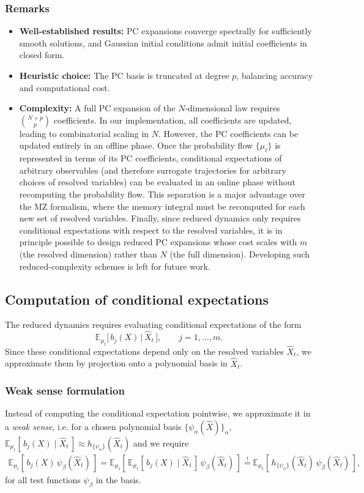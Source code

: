 \documentclass[11pt, a4paper, oneside, reqno]{amsart}
\begin{document}
\subsubsection{Remarks}
\begin{itemize}
\item \textbf{Well-established results:} PC expansions converge spectrally for sufficiently smooth solutions, and Gaussian initial conditions admit initial coefficients in closed form.  
\item \textbf{Heuristic choice:} The PC basis is truncated at degree $p$, balancing accuracy and computational cost.  
\item \textbf{Complexity:} A full PC expansion of the $N$-dimensional law requires $\binom{N+p}{p}$ coefficients.  
In our implementation, all coefficients are updated, leading to combinatorial scaling in $N$. 
However, the PC coefficients can be updated entirely in an {offline phase}.  
Once the probability flow $\{\mu_t\}$ is represented in terms of its PC coefficients, conditional expectations of arbitrary observables (and therefore surrogate trajectories for arbitrary choices of resolved variables) can be evaluated in an {online phase} without recomputing the probability flow.  
This separation is a major advantage over the MZ formalism, where the memory integral must be recomputed for each new set of resolved variables.   
Finally, since reduced dynamics only requires conditional expectations with respect to the resolved variables, it is in principle possible to design reduced PC expansions whose cost scales with $m$ (the resolved dimension) rather than $N$ (the full dimension). Developing such reduced-complexity schemes is left for future work. 
\end{itemize}
\subsection{Computation of conditional expectations}
\noindent The reduced dynamics requires evaluating conditional expectations of the form
\[
\mathbb{E}_{\mu_t}\big[\, b_j(X) \,\big|\, \hat{X}_t \,\big], 
\qquad j=1,\dots,m.
\]
Since these conditional expectations depend only on the resolved variables $\hat{X}_t$, we approximate them by projection onto a polynomial basis in $\hat{X}_t$.  
\subsubsection{Weak sense formulation}  
\noindent Instead of computing the conditional expectation pointwise, we approximate it in a \emph{weak sense}, i.e. for a chosen polynomial basis $\{\psi_\alpha(\hat{X})\}_\alpha$, $\mathbb{E}_{\mu_t}[\, b_j(X)\mid \hat{X}_t\,]\approx h_{\{\psi_\alpha\}}(\hat{X}_t)$ and we require
\begin{eqnarray}
\mathbb{E}_{\mu_t}\!\left[\, b_j(X)\,\psi_\beta(\hat{X}_t)\,\right] 
= \mathbb{E}_{\mu_t}\!\left[\, \mathbb{E}_{\mu_t}[\,b_j(X)\mid \hat{X}_t\,]\,\psi_\beta(\hat{X}_t)\,\right] \overset{!}{=} \mathbb{E}_{\mu_t}\left[\, h_{\{\psi_\alpha\}}(\hat{X}_t)\,\psi_\beta(\hat{X}_t)\,\right],
\end{eqnarray}
for all test functions $\psi_\beta$ in the basis. 
\end{document}

